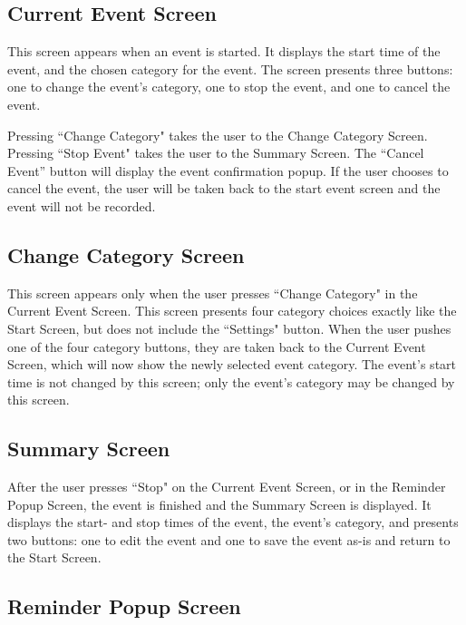\documentclass[11pt]{article}
\begin{document}
\subsection{Current Event Screen}

This screen appears when an event is started. It displays the start time of the event, and the chosen category for the event. The screen presents three buttons: one to change the event's category, one to stop the event, and one to cancel the event.

Pressing ``Change Category" takes the user to the Change Category Screen. Pressing ``Stop Event" takes the user to the Summary Screen. The ``Cancel Event'' button will display the event confirmation popup. If the user chooses to cancel the event, the user will be taken back to the start event screen and the event will not be recorded.

\subsection{Change Category Screen}

This screen appears only when the user presses ``Change Category" in the Current Event Screen. This screen presents four category choices exactly like the Start Screen, but does not include the ``Settings" button. When the user pushes one of the four category buttons, they are taken back to the Current Event Screen, which will now show the newly selected event category. The event's start time is not changed by this screen; only the event's category may be changed by this screen.

\subsection{Summary Screen}

After the user presses ``Stop" on the Current Event Screen, or in the Reminder Popup Screen, the event is finished and the Summary Screen is displayed. It displays the start- and stop times of the event, the event's category, and presents two buttons: one to edit the event and one to save the event as-is and return to the Start Screen.

\subsection{Reminder Popup Screen}
\end{document}
